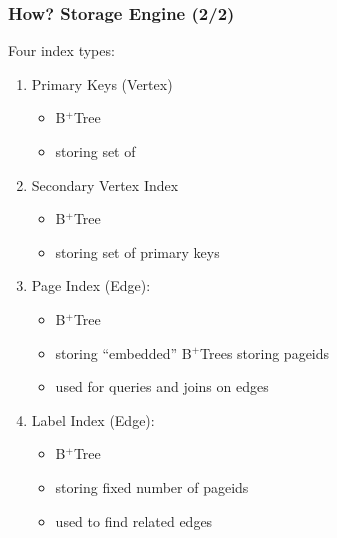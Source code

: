 \documentclass[mathserif]{beamer}
\begin{document}
\begin{frame}
\frametitle{How? Storage Engine (2/2)}
Four index types:
\begin{enumerate}
\item Primary Keys (Vertex)
      \begin{itemize}
      \item B$^+$Tree
      \item storing set of 
      \end{itemize}
\item Secondary Vertex Index
      \begin{itemize}
      \item B$^+$Tree
      \item storing set of primary keys
      \end{itemize}
\item Page Index (Edge):
      \begin{itemize}
      \item B$^+$Tree
      \item storing ``embedded'' B$^+$Trees
            storing pageids
      \item used for queries and joins on edges
      \end{itemize}
\item Label Index (Edge):
      \begin{itemize}
      \item B$^+$Tree
      \item storing fixed number of pageids
      \item used to find related edges
      \end{itemize}
\end{enumerate}
\end{frame}
\end{document}
